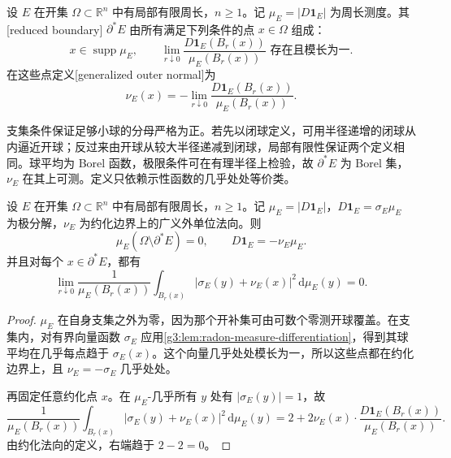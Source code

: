 \begin{definition}\label{g3:def:reduced-boundary}
	设 \(E\) 在开集 \(\Omega\subset\mathbb R^n\) 中有局部有限周长，\(n\ge1\)。记 \(\mu_E=|D\mathbf1_E|\) 为周长测度。其[reduced boundary] \(\partial^*E\) 由所有满足下列条件的点 \(x\in\Omega\) 组成：
	\[
		x\in\operatorname{supp}\mu_E,\qquad
		\lim_{r\downarrow0}
		\frac{D\mathbf1_E(B_r(x))}{\mu_E(B_r(x))}
		\text{ 存在且模长为一}.
	\]
	在这些点定义[generalized outer normal]为
	\begin{equation}\label{g3:eq:reduced-boundary-normal}
		\nu_E(x)=-\lim_{r\downarrow0}
		\frac{D\mathbf1_E(B_r(x))}{\mu_E(B_r(x))}.
	\end{equation}
\end{definition}

支集条件保证足够小球的分母严格为正。若先以闭球定义，可用半径递增的闭球从内逼近开球；反过来由开球从较大半径递减到闭球，局部有限性保证两个定义相同。球平均为 Borel 函数，极限条件可在有理半径上检验，故 \(\partial^*E\) 为 Borel 集，\(\nu_E\) 在其上可测。定义只依赖示性函数的几乎处处等价类。

\begin{proposition}\label{g3:prop:reduced-boundary-full-measure}
	设 \(E\) 在开集 \(\Omega\subset\mathbb R^n\) 中有局部有限周长，\(n\ge1\)。记 \(\mu_E=|D\mathbf1_E|\)，\(D\mathbf1_E=\sigma_E\mu_E\) 为极分解，\(\nu_E\) 为约化边界上的广义外单位法向。则
	\[
		\mu_E(\Omega\setminus\partial^*E)=0,\qquad
		D\mathbf1_E=-\nu_E\mu_E.
	\]
	并且对每个 \(x\in\partial^*E\)，都有
	\begin{equation}\label{g3:eq:reduced-normal-mean-square}
		\lim_{r\downarrow0}
		\frac1{\mu_E(B_r(x))}
		\int_{B_r(x)}|\sigma_E(y)+\nu_E(x)|^2\,\mathrm d\mu_E(y)=0.
	\end{equation}
\end{proposition}
\begin{proof}
	\(\mu_E\) 在自身支集之外为零，因为那个开补集可由可数个零测开球覆盖。在支集内，对有界向量函数 \(\sigma_E\) 应用\cref{g3:lem:radon-measure-differentiation}，得到其球平均在几乎每点趋于 \(\sigma_E(x)\)。这个向量几乎处处模长为一，所以这些点都在约化边界上，且 \(\nu_E=-\sigma_E\) 几乎处处。

	再固定任意约化点 \(x\)。在 \(\mu_E\)-几乎所有 \(y\) 处有 \(|\sigma_E(y)|=1\)，故
	\[
		\frac1{\mu_E(B_r(x))}
		\int_{B_r(x)}|\sigma_E(y)+\nu_E(x)|^2\,\mathrm d\mu_E(y)
		=2+2\nu_E(x)\cdot
		\frac{D\mathbf1_E(B_r(x))}{\mu_E(B_r(x))}.
	\]
	由约化法向的定义，右端趋于 \(2-2=0\)。
\end{proof}

